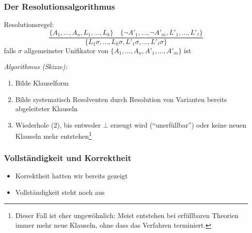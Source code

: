 \documentclass[aspectratio=1610,onlymath]{beamer}
\begin{document}
\maketitle


% 

\begin{frame}\frametitle{Der Resolutionsalgorithmus}

Resolutionsregel:
\[  \frac{
\{A_1,\ldots,A_n,L_1,\ldots,L_k\}\quad
\{\neg A'_1,\ldots,\neg A'_m,L'_1,\ldots,L'_\ell\}
}{\{L_1\sigma,\ldots,L_k\sigma,L'_1\sigma,\ldots,L'_\ell\sigma\}
}\]
falls $\sigma$ allgemeinster Unifikator von $\{A_1,\ldots,A_n, A'_1,\ldots, A'_m\}$ ist\bigskip

\emph{Algorithmus (Skizze):}
\begin{enumerate}[(1)]
\item Bilde Klauselform
\item Bilde systematisch Resolventen durch Resolution von Varianten bereits abgeleiteter Klauseln
\item Wiederhole (2), bis entweder $\bot$ erzeugt wird ("`unerfüllbar"') oder keine neuen Klauseln mehr entstehen\footnote{Dieser Fall ist eher ungewöhnlich: Meist entstehen bei erfüllbaren Theorien immer mehr neue Klauseln, ohne dass das Verfahren terminiert.}
\end{enumerate}

\end{frame}

\begin{frame}\frametitle{Vollständigkeit und Korrektheit}


\begin{itemize}
\item Korrektheit hatten wir bereits gezeigt
\item Vollständigkeit steht noch aus
\end{itemize}

\end{frame}
\end{document}
